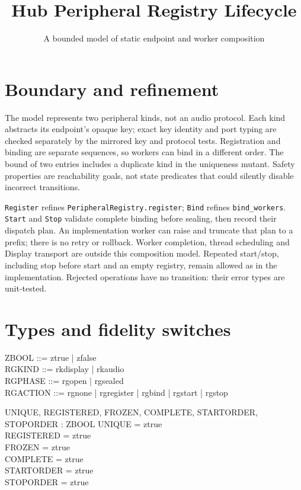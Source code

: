 \documentclass[a4paper,10pt,fleqn]{article}
\begin{document}
\title{Hub Peripheral Registry Lifecycle}
\author{A bounded model of static endpoint and worker composition}
\date{}
\maketitle

\section{Boundary and refinement}
The model represents two peripheral kinds, not an audio protocol. Each kind
abstracts its endpoint's opaque key; exact key identity and port typing are
checked separately by the mirrored key and protocol tests. Registration and
binding are separate sequences, so workers can bind in a different order.
The bound of two entries includes a duplicate kind in the uniqueness mutant.
Safety properties are reachability goals, not state predicates that could
silently disable incorrect transitions.

\texttt{Register} refines \texttt{PeripheralRegistry.register};
\texttt{Bind} refines \texttt{bind\_workers}. \texttt{Start} and \texttt{Stop}
validate complete binding before sealing, then record their dispatch plan.
An implementation worker can raise and truncate that plan to a prefix; there
is no retry or rollback. Worker completion, thread scheduling and Display
transport are outside this composition model. Repeated start/stop, including
stop before start and an empty registry, remain allowed as in the implementation.
Rejected operations have no transition: their error types are unit-tested.

\section{Types and fidelity switches}
\begin{zed}
  ZBOOL ::= ztrue | zfalse \\
  RGKIND ::= rkdisplay | rkaudio \\
  RGPHASE ::= rgopen | rgsealed \\
  RGACTION ::= rgnone | rgregister | rgbind | rgstart | rgstop
\end{zed}
\begin{axdef}
  UNIQUE, REGISTERED, FROZEN, COMPLETE, STARTORDER, STOPORDER : ZBOOL
\where
  UNIQUE = ztrue \\
  REGISTERED = ztrue \\
  FROZEN = ztrue \\
  COMPLETE = ztrue \\
  STARTORDER = ztrue \\
  STOPORDER = ztrue
\end{axdef}
\end{document}
